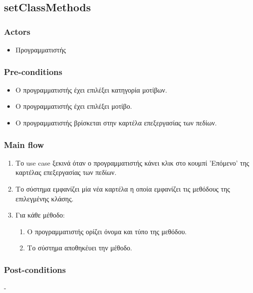 \documentclass[../diploma_thesis.tex]{subfiles}
\begin{document}
\subsection{setClassMethods}
\subsubsection{Actors}
\begin{itemize}
\item  Προγραμματιστής
\end{itemize}
\subsubsection{Pre-conditions}
\begin{itemize}
\item Ο προγραμματιστής έχει επιλέξει κατηγορία μοτίβων.
\item  Ο προγραμματιστής έχει επιλέξει μοτίβο.
\item Ο προγραμματιστής βρίσκεται στην καρτέλα επεξεργασίας των πεδίων.
\end{itemize}
\subsubsection{Main flow}
\begin{enumerate}
\item Το use case ξεκινά όταν ο προγραμματιστής κάνει κλικ στο κουμπί 'Επόμενο' της καρτέλας επεξεργασίας των πεδίων.
\item Το σύστημα εμφανίζει μία νέα καρτέλα η οποία εμφανίζει τις μεθόδους της επιλεγμένης κλάσης.
\item Για κάθε μέθοδο:\begin{enumerate}
\item Ο προγραμματιστής ορίζει όνομα και τύπο της μεθόδου.
\item Το σύστημα αποθηκέυει την μέθοδο.
\end{enumerate}
\end{enumerate}
\subsubsection{Post-conditions}
-
\end{document}
